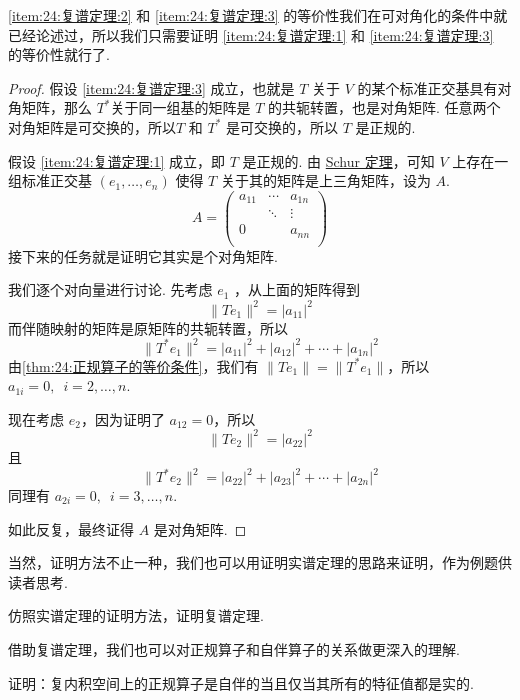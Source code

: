 \ref*{item:24:复谱定理:2} 和 \ref*{item:24:复谱定理:3} 的等价性我们在可对角化的条件中就已经论述过，所以我们只需要证明 \ref*{item:24:复谱定理:1} 和 \ref*{item:24:复谱定理:3} 的等价性就行了.

\begin{proof}
    假设 \ref*{item:24:复谱定理:3} 成立，也就是 $ T $ 关于 $ V $ 的某个标准正交基具有对角矩阵，那么 $ T^* $关于同一组基的矩阵是 $ T $ 的共轭转置，也是对角矩阵. 任意两个对角矩阵是可交换的，所以$ T $ 和 $ T^* $ 是可交换的，所以 $ T $ 是正规的.

    假设 \ref*{item:24:复谱定理:1} 成立，即 $ T $ 是正规的. 由 \hyperref[thm:23:Schur]{Schur 定理}，可知 $ V $ 上存在一组标准正交基 $ (e_1, \ldots , e_n) $ 使得 $ T $ 关于其的矩阵是上三角矩阵，设为 $ A $.
    \[ A = \begin{pmatrix}
             a_{11} & \cdots & a_{1n} \\
                    & \ddots & \vdots \\
             0      &        & a_{nn} \\
        \end{pmatrix} \]
    接下来的任务就是证明它其实是个对角矩阵.

    我们逐个对向量进行讨论. 先考虑 $ e_1 $ ，从上面的矩阵得到
    \[ \lVert Te_1 \rVert^2 = \lvert a_{11} \rvert^2 \]
    而伴随映射的矩阵是原矩阵的共轭转置，所以
    \[ \lVert T^*e_1 \rVert^2 = \lvert a_{11} \rvert^2 + \lvert a_{12} \rvert^2 + \cdots + \lvert a_{1n} \rvert^2 \]
    由\autoref{thm:24:正规算子的等价条件}，我们有 $ \lVert Te_1 \rVert = \lVert T^*e_1 \rVert $，所以 $ a_{1i} = 0,\enspace i = 2, \ldots , n $.

    现在考虑 $ e_2 $，因为证明了 $ a_{12} = 0 $，所以
    \[ \lVert Te_2 \rVert^2 = \lvert a_{22} \rvert^2 \]
    且
    \[ \lVert T^*e_2 \rVert^2 = \lvert a_{22} \rvert^2 + \lvert a_{23} \rvert^2 + \cdots + \lvert a_{2n} \rvert^2 \]
    同理有 $ a_{2i} = 0,\enspace i = 3, \ldots , n $.

    如此反复，最终证得 $ A $ 是对角矩阵.
\end{proof}

当然，证明方法不止一种，我们也可以用证明实谱定理的思路来证明，作为例题供读者思考.

\begin{example}
    仿照实谱定理的证明方法，证明复谱定理.
\end{example}

借助复谱定理，我们也可以对正规算子和自伴算子的关系做更深入的理解.

\begin{example}
    证明：复内积空间上的正规算子是自伴的当且仅当其所有的特征值都是实的.
\end{example}

